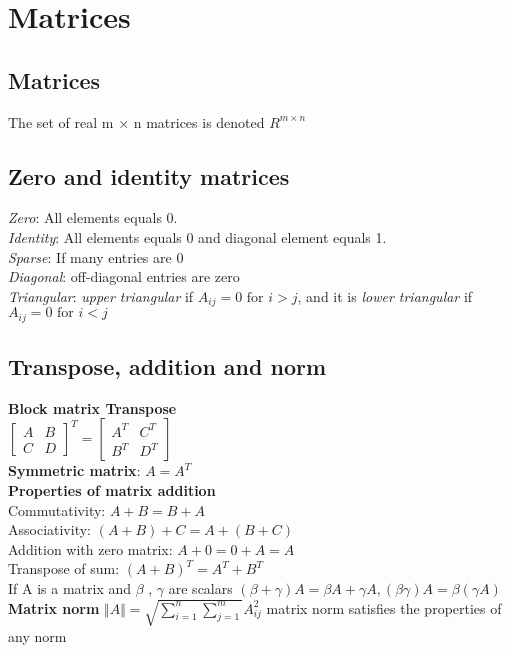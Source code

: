 \section{Matrices}
\subsection{Matrices}
The set of real m × n matrices is denoted $R^{m \times n}$
\subsection{Zero and identity matrices}
\textbullet \textit{Zero}: All elements equals 0.\\
\textbullet \textit{Identity}: All elements equals 0 and diagonal element equals 1.\\
\textbullet \textit{Sparse}: If many entries are 0\\
\textbullet \textit{Diagonal}: off-diagonal entries are zero\\
\textbullet \textit{Triangular}: \textit{upper triangular} if $A_{ij} = 0 \text{ for } i>j$, and it is \textit{lower triangular} if $A_{ij} =0 \text{ for } i<j$

\subsection{Transpose, addition and norm}
\textbf{Block matrix Transpose}\\
$
\begin{bmatrix}
    A & B \\
    C & D
    
\end{bmatrix}^{T}= 
\begin{bmatrix}
    A^T & C^T \\
    B^T & D^T
\end{bmatrix}
$\\
\textbf{Symmetric matrix}: $A = A^T$\\
\textbf{Properties of matrix addition}\\
\textbullet Commutativity: $A+B=B+A$\\
\textbullet Associativity: $(A + B) + C = A + (B + C)$\\
\textbullet Addition with zero matrix: $A+0=0+A=A$\\
\textbullet Transpose of sum:  $(A+B)^T = A^T +B^T$\\
If A is a matrix and $\beta$ , $\gamma$ are scalars
$(\beta + \gamma)A = \beta A + \gamma A, 
(\beta \gamma)A = \beta(\gamma A)
$\\
\textbf{Matrix norm}
$\Vert A \Vert = \sqrt{\sum_{i=1}^n\sum_{j=1}^m} A^2_{ij}$
matrix norm satisfies the properties of any norm

